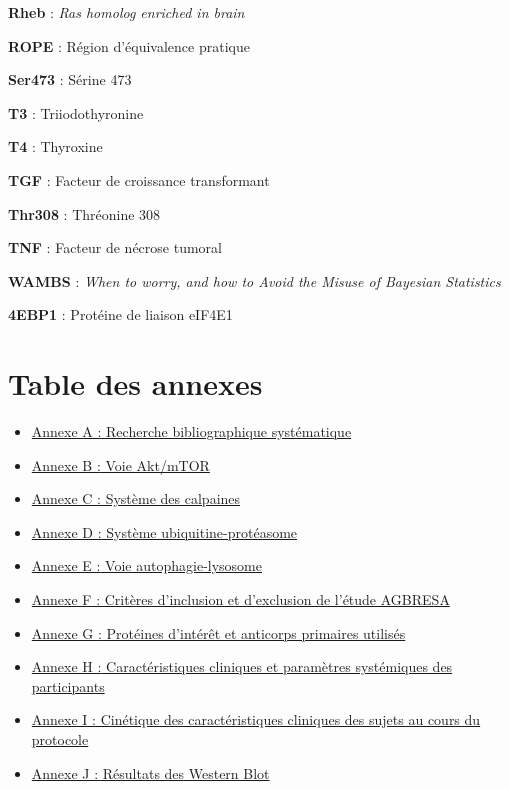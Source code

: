 \documentclass[11pt]{report}
\begin{document}
{\begin{minipage}[t]{0.45\textwidth}
		\textbf{Rheb} : \textit{Ras homolog enriched in brain}
		
		\textbf{ROPE} : Région d'équivalence pratique
		
		\bigskip
		
		\textbf{Ser473} : Sérine 473
		
		\bigskip
		
		\textbf{T3} : Triiodothyronine
		
		\textbf{T4} : Thyroxine
		
		\textbf{TGF} : Facteur de croissance transformant
		
		\textbf{Thr308} : Thréonine 308
		
		\textbf{TNF} : Facteur de nécrose tumoral
		
		\bigskip
		
		\textbf{WAMBS} : \textit{When to worry, and how to Avoid the Misuse of Bayesian Statistics}
		
		\bigskip
		
		\textbf{4EBP1} : Protéine de liaison eIF4E1
		
	\end{minipage}
}

\newpage

\listoffigures
\begingroup
\let\clearpage\relax
\listoftables
\endgroup

\chapter*{Table des annexes}
\begin{itemize}[label={},leftmargin=1.5em]
	\item \hyperref[annexeA]{{Annexe A :} Recherche bibliographique systématique}
    \item \hyperref[annexeB]{{Annexe B :} Voie Akt/mTOR}
    \item \hyperref[annexeC]{{Annexe C :} Système des calpaines}
    \item \hyperref[annexeD]{{Annexe D :} Système ubiquitine-protéasome}
    \item \hyperref[annexeE]{{Annexe E :} Voie autophagie-lysosome}
    \item \hyperref[annexeF]{{Annexe F :} Critères d'inclusion et d'exclusion de l'étude AGBRESA}
    \item \hyperref[annexeG]{{Annexe G :} Protéines d'intérêt et anticorps primaires utilisés}
   	\item \hyperref[annexeH]{{Annexe H :} Caractéristiques cliniques et paramètres systémiques des participants}
    \item \hyperref[annexeI]{{Annexe I :} Cinétique des caractéristiques cliniques des sujets au cours du protocole}
    \item \hyperref[annexeJ]{{Annexe J :} Résultats des Western Blot}
\end{itemize}
\newpage
\end{document}
